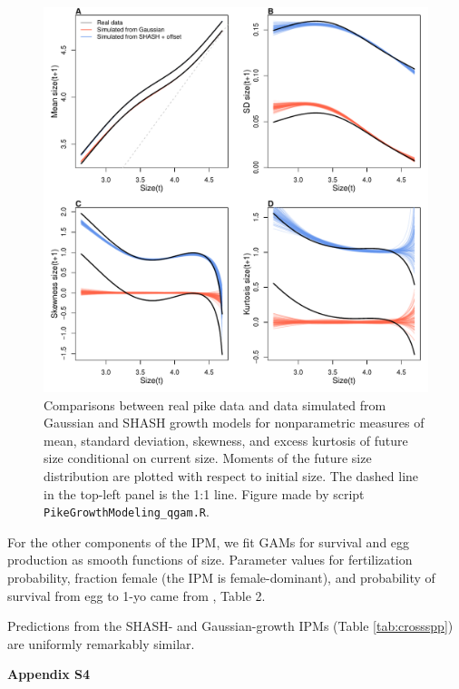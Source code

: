\documentclass[12pt]{article}
\begin{document}
\begin{spacing}{1.35}
	\begin{figure}[tbp]
		\centering
		\includegraphics[width=1.0\textwidth]{figures/pike_SHASH_fit.pdf}
		\caption{Comparisons between real pike data and data simulated from Gaussian and SHASH growth models for nonparametric measures of mean, standard deviation, 
			skewness, and excess kurtosis of future size conditional on current size. 
			Moments of the future size distribution are plotted with respect to initial size. The dashed line in the top-left panel is the 1:1 line. 
			Figure made by script \texttt{PikeGrowthModeling\_qgam.R}.}
		\label{fig:pikeSims}
	\end{figure} 
	
	For the other components of the IPM, we fit GAMs for survival and egg production as smooth functions of size. 
	Parameter values for fertilization probability, fraction female (the IPM is female-dominant), and probability of survival from egg to 1-yo 
	came from \cite{stubberud2019effects}, Table 2. 
	
	Predictions from the SHASH- and Gaussian-growth IPMs (Table \ref{tab:crossspp}) are uniformly remarkably similar. 
	
	\clearpage 
	
		\newpage
	\linenumbers
	\centerline{\Large{\textbf{Appendix S4}}}
	\renewcommand{\thetable}{S-\arabic{table}}
	\renewcommand{\thefigure}{S-\arabic{figure}}
	\renewcommand{\thesection}{S.\arabic{section}}
	\renewcommand{\theequation}{S\arabic{equation}}
	\setcounter{page}{1}
	\setcounter{equation}{0}
	\setcounter{figure}{0}
	\setcounter{section}{0}
	\setcounter{table}{0}

\end{spacing}
\end{document}
